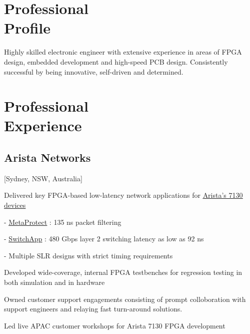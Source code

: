 \documentclass{mycv}
\begin{document}
\newcommand{\SubItem}[1]{
    {\setlength\itemindent{15pt} \item[-] #1}
}

\maketitle%

\section{Professional \\ Profile}

Highly skilled electronic engineer with extensive experience in areas of FPGA design, embedded development and high-speed PCB design. 
Consistently successful by being innovative, self-driven and determined.

\section{Professional \\ Experience}

\subsection{Arista Networks}[Sydney, NSW, Australia]
\begin{positions}
\end{positions}

\begin{itemize}[noitemsep]
  \item Delivered key FPGA-based low-latency network applications for \href{https://www.arista.com/en/products/7130-network-applications-quick-look}{\underline{Arista's 7130 devices}}
    \SubItem{\href{https://www.arista.com/assets/data/pdf/ProductBrief-MetaProtect-Firewall.pdf}{\underline{MetaProtect}} : 135 ns packet filtering}
    \SubItem{\href{https://www.arista.com/assets/data/pdf/ProductBrief-SwitchApp.pdf}{\underline{SwitchApp}} : 480 Gbps layer 2 switching latency as low as 92 ns}
    \SubItem{Multiple SLR designs with strict timing requirements}
  \item Developed wide-coverage, internal FPGA testbenches for regression testing in both simulation and in hardware
  \item Owned customer support engagements consisting of prompt colloboration with support engineers and relaying fast turn-around solutions.
  \item Led live APAC customer workshops for Arista 7130 FPGA development
\end{itemize}
\end{document}

